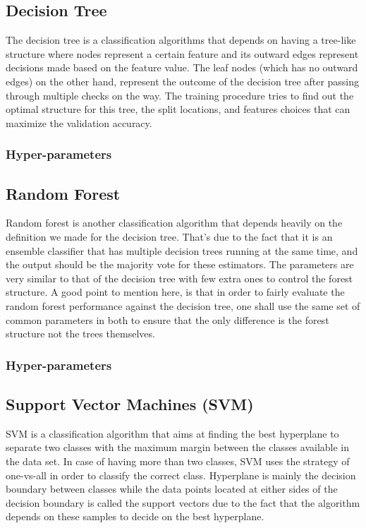 \documentclass{article}
\begin{document}
\subsection{Decision Tree}
The decision tree is a classification algorithms that depends on having a tree-like structure where nodes represent a certain feature and its outward edges represent decisions made based on the feature value. The leaf nodes (which has no outward edges) on the other hand, represent the outcome of the decision tree after passing through multiple checks on the way. The training procedure tries to find out the optimal structure for this tree, the split locations, and features choices that can maximize the validation accuracy. 
\subsubsection*{Hyper-parameters}


\subsection{Random Forest}
Random forest is another classification algorithm that depends heavily on the definition we made for the decision tree. That's due to the fact that it is an ensemble classifier that has multiple decision trees running at the same time, and the output should be the majority vote for these estimators. The parameters are very similar to that of the decision tree with few extra ones to control the forest structure. A good point to mention here, is that in order to fairly evaluate the random forest performance against the decision tree, one shall use the same set of common parameters in both to ensure that the only difference is the forest structure not the trees themselves. 
\subsubsection*{Hyper-parameters}


\subsection{Support Vector Machines (SVM)}
SVM is a classification algorithm that aims at finding the best hyperplane to separate two classes with the maximum margin between the classes available in the data set. In case of having more than two classes, SVM uses the strategy of one-vs-all in order to classify the correct class. Hyperplane is mainly the decision boundary between classes while the data points located at either sides of the decision boundary is called the support vectors due to the fact that the algorithm depends on these samples to decide on the best hyperplane. 
\end{document}

